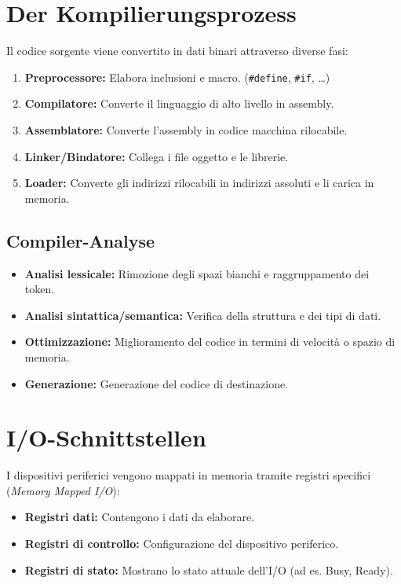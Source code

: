 \section{Der Kompilierungsprozess}
Il codice sorgente viene convertito in dati binari attraverso diverse fasi:

\begin{enumerate}
    \item \textbf{Preprocessore:} Elabora inclusioni e macro.
    (\texttt{\#define}, \texttt{\#if}, \dots)
    \item \textbf{Compilatore:} Converte il linguaggio di alto livello in assembly.
    \item \textbf{Assemblatore:} Converte l'assembly in codice macchina rilocabile.
    \item \textbf{Linker/Bindatore:} Collega i file oggetto e le librerie.
    \item \textbf{Loader:} Converte gli indirizzi rilocabili in indirizzi assoluti e li carica in memoria.
\end{enumerate}

\subsection{Compiler-Analyse}
\begin{itemize}
    \item \textbf{Analisi lessicale:} Rimozione degli spazi bianchi e raggruppamento dei token.
    \item \textbf{Analisi sintattica/semantica:} Verifica della struttura e dei tipi di dati.
    \item \textbf{Ottimizzazione:} Miglioramento del codice in termini di velocità o spazio di memoria.
    \item \textbf{Generazione:} Generazione del codice di destinazione.
\end{itemize}

\section{I/O-Schnittstellen}
I dispositivi periferici vengono mappati in memoria tramite registri specifici (\textit{Memory Mapped I/O}):
\begin{itemize}
    \item \textbf{Registri dati:} Contengono i dati da elaborare.
    \item \textbf{Registri di controllo:} Configurazione del dispositivo periferico.
    \item \textbf{Registri di stato:} Mostrano lo stato attuale dell'I/O (ad es. Busy, Ready).
\end{itemize}